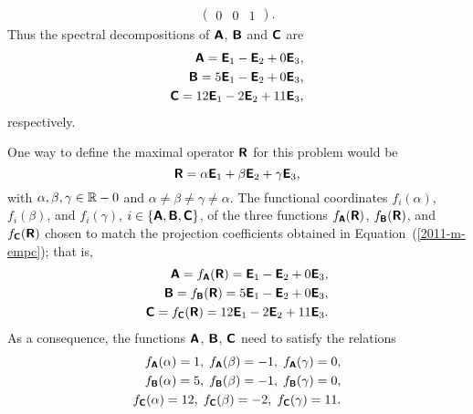 {\begin{equation}
\begin{split}
\begin{pmatrix}
0& 0& 1
\end{pmatrix}.
\end{split}
\end{equation}
Thus the spectral decompositions of
$\textsf{\textbf{A}}$,
$\textsf{\textbf{B}}$  and
$\textsf{\textbf{C}}$ are
\begin{equation}
\begin{split}
\textsf{\textbf{A}}= \textsf{\textbf{E}}_1  - \textsf{\textbf{E}}_2  + 0  \textsf{\textbf{E}}_3,\\
\textsf{\textbf{B}}= 5\textsf{\textbf{E}}_1  - \textsf{\textbf{E}}_2  + 0 \textsf{\textbf{E}}_3,\\
\textsf{\textbf{C}}= 12\textsf{\textbf{E}}_1  -2 \textsf{\textbf{E}}_2  + 11\textsf{\textbf{E}}_3,
\end{split}
\label{2011-m-empc}
\end{equation}
respectively.


One way to define the  maximal operator  $\textsf{\textbf{R}}$ for this problem
would be
$$
\textsf{\textbf{R}} = \alpha \textsf{\textbf{E}}_1  + \beta \textsf{\textbf{E}}_2  + \gamma  \textsf{\textbf{E}}_3,
$$
with
$\alpha ,  \beta ,   \gamma \in {\Bbb R}-0$ and
$\alpha  \neq \beta  \neq   \gamma \neq \alpha  $.
The functional coordinates
$f_i(\alpha )$, $f_i(\beta)$, and $f_i(\gamma)$,
$i\in \{\textsf{\textbf{A}},\textsf{\textbf{B}},\textsf{\textbf{C}}\}$,  of the three functions
$ f_\textsf{\textbf{A}}(\textsf{\textbf{R}})$,
$ f_\textsf{\textbf{B}}(\textsf{\textbf{R}})$, and
$ f_\textsf{\textbf{C}}(\textsf{\textbf{R}})$
chosen to match the projection coefficients obtained in Equation~(\ref{2011-m-empc});
that is,
\begin{equation}
\begin{split}
\textsf{\textbf{A}}= f_\textsf{\textbf{A}}(\textsf{\textbf{R}})=  \textsf{\textbf{E}}_1  - \textsf{\textbf{E}}_2  + 0  \textsf{\textbf{E}}_3,\\
\textsf{\textbf{B}}=  f_\textsf{\textbf{B}}(\textsf{\textbf{R}})= 5\textsf{\textbf{E}}_1  - \textsf{\textbf{E}}_2  + 0 \textsf{\textbf{E}}_3,\\
\textsf{\textbf{C}}=  f_\textsf{\textbf{C}}(\textsf{\textbf{R}})= 12\textsf{\textbf{E}}_1  -2 \textsf{\textbf{E}}_2  + 11\textsf{\textbf{E}}_3.
\end{split}
\end{equation}
As a consequence, the functions
$\textsf{\textbf{A}}$,
$\textsf{\textbf{B}}$,
$\textsf{\textbf{C}}$ need to satisfy the relations
\begin{equation}
\begin{split}
f_\textsf{\textbf{A}}(\alpha ) =1,\; f_\textsf{\textbf{A}}(\beta ) =-1,\; f_\textsf{\textbf{A}}(\gamma ) =0,\\
f_\textsf{\textbf{B}}(\alpha ) =5,\; f_\textsf{\textbf{B}}(\beta ) =-1,\; f_\textsf{\textbf{B}}(\gamma ) =0,\\
f_\textsf{\textbf{C}}(\alpha ) =12,\; f_\textsf{\textbf{C}}(\beta ) =-2,\; f_\textsf{\textbf{C}}(\gamma ) =11.
\end{split}
\label{2011-m-empc-fsr}
\end{equation}

\eexample
}

